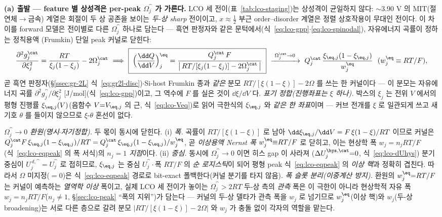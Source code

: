 \textbf{(a) 출발 --- feature 별 상성격은 per-peak $\Omega_j^\cat$ 가 가른다.} LCO 세 전이(표~\ref{tab:lco-staging})는
상성격이 균일하지 않다: $\sim$3.90 V 의 MIT(절연체$\to$금속) 계열은 회절이 두 상 공존을 보이는 \emph{두-상 sharp}
전이이고\cite{reimers1992,menetrier1999}, $x\approx\tfrac12$ 부근 order--disorder 계열은 정렬 상호작용이 무대인
전이다\cite{vanderven1998}. 이 차이를 forward 모델은 전이별로 다른 $\Omega_j^\cat$ 하나로 담는다 --- 흑연
판정자와 같은 문턱에서(식~\eqref{eq:lco-gpp}$\cdot$\eqref{eq:lco-spinodal}), 자유에너지 곡률이 정하는 정칙용액
(Frumkin) 단일 peak 커널로 닫힌다:
\begin{equation}
\frac{\partial^2 g_j^\cat}{\partial\xi_j^2}=\frac{RT}{\xi_j(1-\xi_j)}-2\Omega_j^\cat
\ \Longrightarrow\
\boxed{\;\Big(\frac{\dd Q}{\dd V}\Big)^\eq_j=\frac{Q_j^\cat\,F}{\big|\,RT/[\xi_j(1-\xi_j)]-2\Omega_j^\cat\,\big|}\;}
\ \xrightarrow[\ ]{\ \Omega_j^\cat\to0\ }\
Q_j^\cat\,\frac{\xi_{\eq,j}(1-\xi_{\eq,j})}{w_j^{\eq}}\ \ (w_j^{\eq}\equiv RT/F),
\label{eq:lcoomega-kernel}
\end{equation}
곧 흑연 판정자(\S\ref{ssec:gr-2L} 식~\eqref{eq:gr2l-disc})$\cdot$Si-host Frumkin 종과 \emph{같은} 분모
$RT/[\xi(1-\xi)]-2\Omega$ 를 쓰는 한 커널이다 --- 이 분모는 자유에너지 곡률 $\partial^2 g_j^\cat/\partial\xi_j^2$
[J/mol](식~\eqref{eq:lco-gpp})이고, 그 역수에 $F$ 를 실은 것이 $\dd\xi/\dd V$ 다. \emph{표기 정합(진행좌표는 $\xi$
하나).} 박스의 $\xi_j$ 는 전위 $V$ 에서의 평형 진행률 $\xi_{\eq,j}(V)$(음함수 $V{=}V_{\eq,j}$ 의 근,
식~\eqref{eq:lco-Veq})로 읽어 극한식의 $\xi_{\eq,j}$ 와 \emph{같은 한 좌표}이며 --- 커브 전개를 $\xi$ 로 일관되게
쓰고 새 기호 $\theta$ 를 들이지 않으므로 $\xi$-$\theta$ 혼선이 없다.

\emph{$\Omega_j^\cat\to0$ 환원(명시$\cdot$자기정합).} 두 몫이 동시에 닫힌다. (i) \emph{폭.} 곡률이
$RT/[\xi(1-\xi)]$ 로 남아 $\dd\xi_{\eq,j}/\dd V=F\,\xi(1-\xi)/RT$ 이므로 커널은
$Q_j^\cat F\,\xi_{\eq,j}(1-\xi_{\eq,j})/RT=Q_j^\cat\,\xi_{\eq,j}(1-\xi_{\eq,j})/w_j^{\eq}$, 곧 \emph{이상용액
Nernst 폭} $w_j^{\eq}{\equiv}RT/F$ 로 닫히고, 이는 현상학 폭 $w_j{=}n_jRT/F$(식~\eqref{eq:lco-eqpeak} 의 폭
서식)의 \emph{$n_j{=}1$ 지점}이다. (ii) \emph{중심.} 동시에 $\Omega_j^\cat\!\to\!0$ 이면 히스 gap 이 사라져
($\Delta U_j^{\hys,\cat}{=}0$, 식~\eqref{eq:lco-dUhys}) 분기 중심이 $U_j^{\,d,\cat}{=}U_j^\cat$ 로 접히므로,
$\xi_{\eq,j}$ 는 중심 $U_j^\cat\cdot$폭 $RT/F$ 의 \emph{순 로지스틱}이 되어 평형 peak 식~\eqref{eq:lco-eqpeak} 의
\emph{이상 핵}과 정확히 겹친다. 따라서 $\Omega$ 미지정($=0$)은 식~\eqref{eq:lco-eqpeak} 경로로 bit-exact
폴백한다(커널 분기를 타지 않음). \emph{폭 슬롯 분리(이중계산 방지).} 환원의 $w_j^{\eq}{=}RT/F$ 는 커널이
예측하는 \emph{열역학 이상} 폭이고, 실제 LCO 세 전이가 놓이는 $\Omega_j^\cat>2RT$ 두-상 측의 \emph{관측} 폭은
이 극한이 아니라 현상학적 자유 폭 $w_j{=}n_jRT/F$($n_j\neq1$, \S\ref{sec:lco-peak} ``폭의 지위'')가 담는다 ---
커널의 두-상 델타가 관측 폭을 $w_j$ 로 넘기므로 $w_j^{\eq}$(이상 핵)와 $w_j$(두-상 broadening)는 서로 다른
층으로 갈려 분모 $|RT/[\xi(1-\xi)]-2\Omega|$ 와 $w_j$ 가 충돌 없이 각자의 역할을 맡는다.


